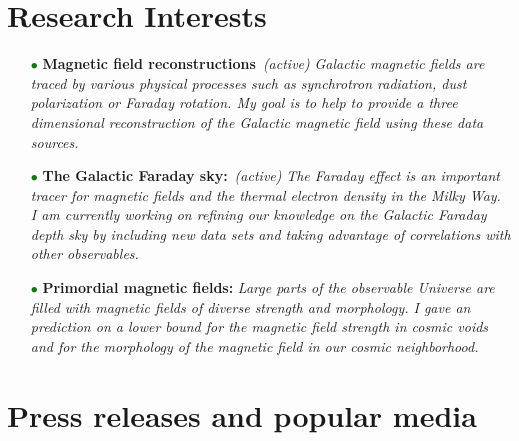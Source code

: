 \documentclass[11pt,a4paper,sans, table, dvipsnames]{moderncv}        %
\begin{document}
\section{Research Interests}
\begin{itemize}

\item[\textcolor{Green}{$\bullet$}]{\textbf{Magnetic field reconstructions} \,\textit{(active)} \newline \textit{Galactic magnetic fields are traced by various physical processes such as synchrotron radiation, dust polarization or Faraday rotation. My goal is to help to provide a three dimensional reconstruction of the Galactic magnetic field using these data sources. }}

\vspace{3pt}

\item[\textcolor{Green}{$\bullet$}]{\textbf{The Galactic Faraday sky:} \,\textit{(active)}  \newline \textit{The Faraday effect is an important tracer for magnetic fields and the thermal electron density in the Milky Way. I am currently working on refining our knowledge on the Galactic Faraday depth sky by including new data sets and taking advantage of correlations with other observables.}}

\vspace{3pt}

\item[\textcolor{Green}{$\bullet$}]{\textbf{Primordial magnetic fields:}  \newline \textit{Large parts of the observable Universe are filled with magnetic fields of diverse strength and morphology. I gave an prediction on a lower bound for the magnetic field strength in cosmic voids and for the morphology of the magnetic field in our cosmic neighborhood. }}
\end{itemize}

\vspace{\baselineskip}
\section{Press releases and popular media}
\end{document}
